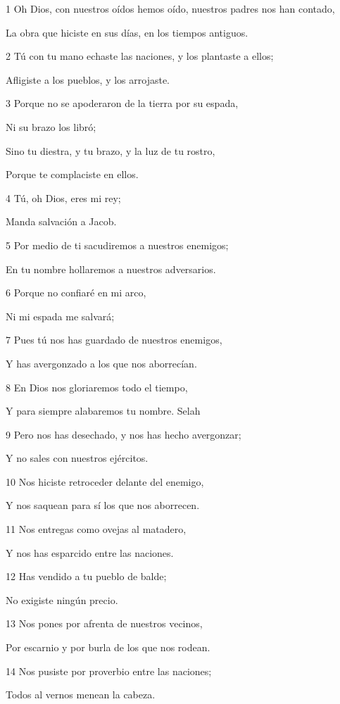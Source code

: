 \par 1 Oh Dios, con nuestros oídos hemos oído, nuestros padres nos han contado,
\par La obra que hiciste en sus días, en los tiempos antiguos.
\par 2 Tú con tu mano echaste las naciones, y los plantaste a ellos;
\par Afligiste a los pueblos, y los arrojaste.
\par 3 Porque no se apoderaron de la tierra por su espada,
\par Ni su brazo los libró;
\par Sino tu diestra, y tu brazo, y la luz de tu rostro,
\par Porque te complaciste en ellos.
\par 4 Tú, oh Dios, eres mi rey;
\par Manda salvación a Jacob.
\par 5 Por medio de ti sacudiremos a nuestros enemigos;
\par En tu nombre hollaremos a nuestros adversarios.
\par 6 Porque no confiaré en mi arco,
\par Ni mi espada me salvará;
\par 7 Pues tú nos has guardado de nuestros enemigos,
\par Y has avergonzado a los que nos aborrecían.
\par 8 En Dios nos gloriaremos todo el tiempo,
\par Y para siempre alabaremos tu nombre. Selah
\par 9 Pero nos has desechado, y nos has hecho avergonzar;
\par Y no sales con nuestros ejércitos.
\par 10 Nos hiciste retroceder delante del enemigo,
\par Y nos saquean para sí los que nos aborrecen.
\par 11 Nos entregas como ovejas al matadero,
\par Y nos has esparcido entre las naciones.
\par 12 Has vendido a tu pueblo de balde;
\par No exigiste ningún precio.
\par 13 Nos pones por afrenta de nuestros vecinos,
\par Por escarnio y por burla de los que nos rodean.
\par 14 Nos pusiste por proverbio entre las naciones;
\par Todos al vernos menean la cabeza.
